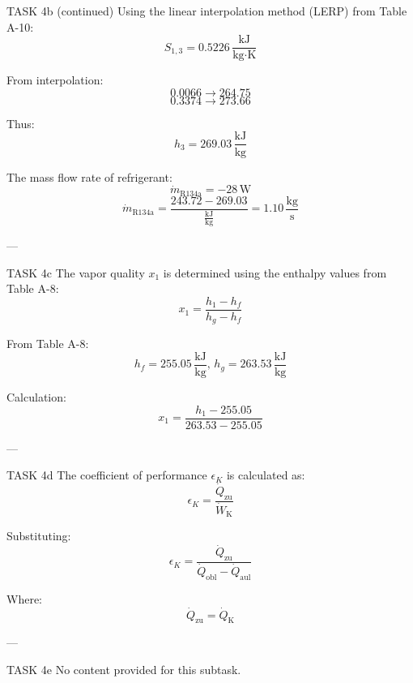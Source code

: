 TASK 4b (continued)  
Using the linear interpolation method (LERP) from Table A-10:  
\[
S_{1,3} = 0.5226 \, \frac{\text{kJ}}{\text{kg·K}}
\]  

From interpolation:  
\[
0.0066 \rightarrow 264.75  
\]  
\[
0.3374 \rightarrow 273.66  
\]  

Thus:  
\[
h_3 = 269.03 \, \frac{\text{kJ}}{\text{kg}}
\]  

The mass flow rate of refrigerant:  
\[
\dot{m}_{\text{R134a}} = -28 \, \text{W}  
\]  
\[
\dot{m}_{\text{R134a}} = \frac{243.72 - 269.03}{\frac{\text{kJ}}{\text{kg}}} = 1.10 \, \frac{\text{kg}}{\text{s}}
\]  

---

TASK 4c  
The vapor quality \( x_1 \) is determined using the enthalpy values from Table A-8:  
\[
x_1 = \frac{h_1 - h_f}{h_g - h_f}
\]  

From Table A-8:  
\[
h_f = 255.05 \, \frac{\text{kJ}}{\text{kg}}, \, h_g = 263.53 \, \frac{\text{kJ}}{\text{kg}}
\]  

Calculation:  
\[
x_1 = \frac{h_1 - 255.05}{263.53 - 255.05}
\]  

---

TASK 4d  
The coefficient of performance \( \epsilon_K \) is calculated as:  
\[
\epsilon_K = \frac{\dot{Q}_{\text{zu}}}{\dot{W}_{\text{K}}}
\]  

Substituting:  
\[
\epsilon_K = \frac{\dot{Q}_{\text{zu}}}{\dot{Q}_{\text{obl}} - \dot{Q}_{\text{aul}}}
\]  

Where:  
\[
\dot{Q}_{\text{zu}} = \dot{Q}_{\text{K}}
\]  

---

TASK 4e  
No content provided for this subtask.  

